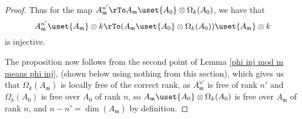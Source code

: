 \documentclass[12 pt]{article}
\theoremstyle{definition}
\begin{document}
\begin{proof}
Thus for the map $A_{\mathfrak{m}}^{n'} \rTo A_\mathfrak{m} \uset{A_0}\otimes \Omega_k(A_0)$, we have that
\[A_{\mathfrak{m}}^{n'} \uset{A_{\mathfrak{m}}}\otimes k \rTo (A_\mathfrak{m} \uset{A_0}\otimes \Omega_k(A_0)) \uset{A_{\mathfrak{m}}}\otimes k\]
is injective.

The proposition now follows from the second point of Lemma \ref{phi inj mod m means phi inj}, (shown below using nothing from this section), which gives us that $\Omega_k(A_\mathfrak{m})$ is locally free of the correct rank, as $A_\mathfrak{m}^{n'}$ is free of rank $n'$ and $\Omega_k(A_0)$ is free over $A_0$ of rank $n$, so $A_\mathfrak{m} \uset{A_0}\otimes \Omega_k(A_0)$ is free over $A_\mathfrak{m}$ of rank $n$, and $n-n'=\dim(A_\mathfrak{m})$ by definition.
\end{proof}
\end{document}
